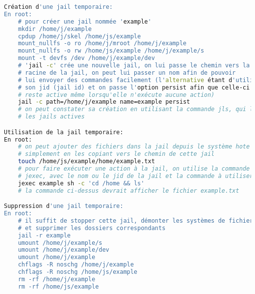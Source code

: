 \documentclass[10pt,a4paper]{article}
\begin{document}
\begin{lstlisting}[language=bash]
Création d'une jail temporaire:
En root:
    # pour créer une jail nommée 'example'
    mkdir /home/j/example
    cpdup /home/j/skel /home/js/example
    mount_nullfs -o ro /home/j/mroot /home/j/example
    mount_nullfs -o rw /home/js/example /home/j/example/s
    mount -t devfs /dev /home/j/example/dev
    # 'jail -c' crée une nouvelle jail, on lui passe le chemin vers la
    # racine de la jail, on peut lui passer un nom afin de pouvoir
    # lui envoyer des commandes facilement (l'alternative étant d'utiliser
    # son jid (jail id) et on passe l'option persist afin que celle-ci
    # reste active même lorsqu'elle n'exécute aucune action)
    jail -c path=/home/j/example name=example persist
    # on peut constater sa création en utilisant la commande jls, qui liste
    # les jails actives

Utilisation de la jail temporaire:
En root:
    # on peut ajouter des fichiers dans la jail depuis le système hote
    # simplement en les copiant vers le chemin de cette jail
    touch /home/js/example/home/example.txt
    # pour faire exécuter une action à la jail, on utilise la commande
    # jexec, avec le nom ou le jid de la jail et la commande à utiliser
    jexec example sh -c 'cd /home && ls'
    # la commande ci-dessus devrait afficher le fichier example.txt

Suppression d'une jail temporaire:
En root:
    # il suffit de stopper cette jail, démonter les systèmes de fichiers
    # et supprimer les dossiers correspondants
    jail -r example
    umount /home/j/example/s
    umount /home/j/example/dev
    umount /home/j/example
    chflags -R noschg /home/j/example
    chflags -R noschg /home/js/example
    rm -rf /home/j/example
    rm -rf /home/js/example

\end{lstlisting}
\end{document}
